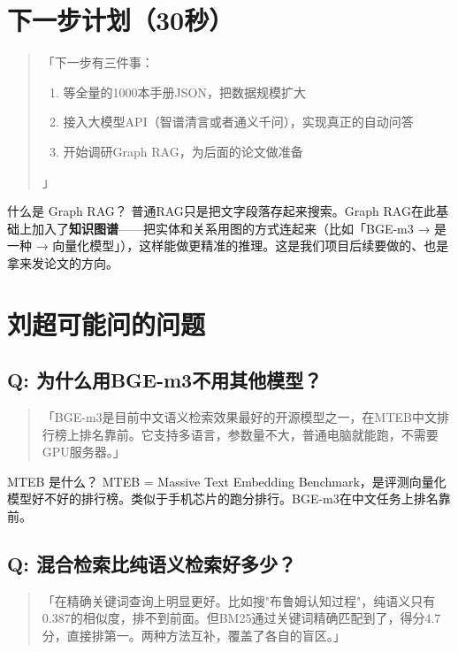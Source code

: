 \documentclass[12pt,a4paper,landscape]{article}
\begin{document}
\section{下一步计划（30秒）}

\begin{quote}
\kaishu
「下一步有三件事：
\begin{enumerate}[nosep]
  \item 等全量的1000本手册JSON，把数据规模扩大
  \item 接入大模型API（智谱清言或者通义千问），实现真正的自动问答
  \item 开始调研Graph RAG，为后面的论文做准备
\end{enumerate}
」
\end{quote}

\begin{termbox}{什么是 Graph RAG？}
普通RAG只是把文字段落存起来搜索。Graph RAG在此基础上加入了\textbf{知识图谱}——把实体和关系用图的方式连起来（比如「BGE-m3 → 是一种 → 向量化模型」），这样能做更精准的推理。这是我们项目后续要做的、也是拿来发论文的方向。
\end{termbox}

\section{刘超可能问的问题}

\subsection{Q: 为什么用BGE-m3不用其他模型？}
\begin{quote}
\kaishu
「BGE-m3是目前中文语义检索效果最好的开源模型之一，在MTEB中文排行榜上排名靠前。它支持多语言，参数量不大，普通电脑就能跑，不需要GPU服务器。」
\end{quote}

\begin{termbox}{MTEB 是什么？}
MTEB = Massive Text Embedding Benchmark，是评测向量化模型好不好的排行榜。类似于手机芯片的跑分排行。BGE-m3在中文任务上排名靠前。
\end{termbox}

\subsection{Q: 混合检索比纯语义检索好多少？}
\begin{quote}
\kaishu
「在精确关键词查询上明显更好。比如搜"布鲁姆认知过程"，纯语义只有0.387的相似度，排不到前面。但BM25通过关键词精确匹配到了，得分4.7分，直接排第一。两种方法互补，覆盖了各自的盲区。」
\end{quote}
\end{document}
